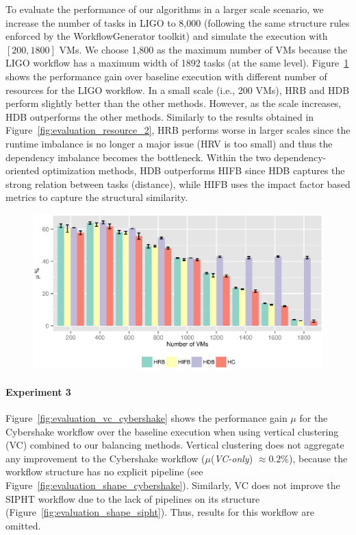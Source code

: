 \documentclass[final,5p,times,twocolumn]{elsarticle}
\begin{document}
To evaluate the performance of our algorithms in a larger scale scenario, we increase the number of tasks in LIGO to 8,000 (following the same structure rules enforced by the WorkflowGenerator toolkit) and simulate the execution with $[200,1800]$ VMs. We choose 1,800 as the maximum number of VMs because the LIGO workflow has a maximum width of 1892 tasks (at the same level). 
Figure~\ref{fig:evaluation_resource_3} shows the performance gain over baseline execution with different number of resources for the LIGO workflow. In a small scale (i.e., 200 VMs), HRB and HDB perform slightly better than the other methods. However, as the scale increases, HDB outperforms the other methods. Similarly to the results obtained in Figure~\ref{fig:evaluation_resource_2}, HRB performs worse in larger scales since the runtime imbalance is no longer a major issue (HRV is too small) and thus the dependency imbalance becomes the bottleneck. Within the two dependency-oriented optimization methods, HDB outperforms HIFB since HDB captures the strong relation between tasks (distance), while HIFB uses the impact factor based metrics to capture the structural similarity. 

\begin{figure}[!htb]
	\centering
	\includegraphics[width=1.0\linewidth]{figure28.eps}
	\label{fig:evaluation_resource_3}
\end{figure}

\paragraph{\textbf{Experiment 3}}
Figure~\ref{fig:evaluation_vc_cybershake} shows the performance gain $\mu$ for the Cybershake workflow over the baseline execution when using vertical clustering (VC) combined to our balancing methods. Vertical clustering does not aggregate any improvement to the Cybershake workflow ($\mu$(\emph{VC-only}) $\approx 0.2\%$), because the workflow structure has no explicit pipeline (see Figure~\ref{fig:evaluation_shape_cybershake}). Similarly, VC does not improve the SIPHT workflow due to the lack of pipelines on its structure (Figure~\ref{fig:evaluation_shape_sipht}). Thus, results for this workflow are omitted.
\end{document}
